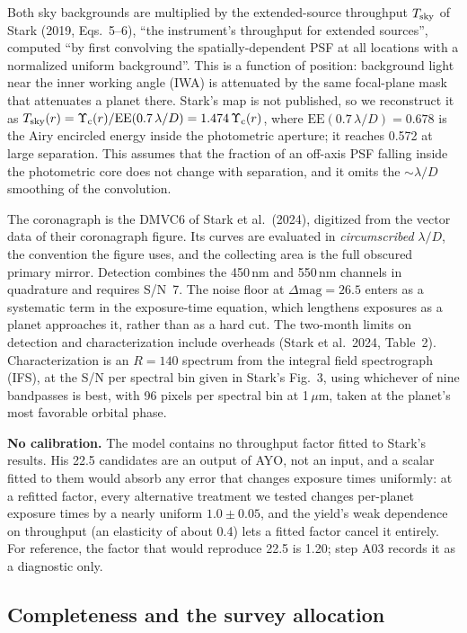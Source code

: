 \documentclass[11pt,a4paper]{article}
\begin{document}
Both sky backgrounds are multiplied by the extended-source throughput $T_{\rm sky}$ of Stark
(2019, Eqs.~5--6), ``the instrument's throughput for extended sources'', computed ``by first
convolving the spatially-dependent PSF at all locations with a normalized uniform background''.
This is a function of position: background light near the inner working angle (IWA) is attenuated
by the same focal-plane mask that attenuates a planet there. Stark's map is not published, so we
reconstruct it as $T_{\rm sky}(r) = \Upsilon_{\rm c}(r)/\mathrm{EE}(0.7\,\lambda/D)
= 1.474\,\Upsilon_{\rm c}(r)$, where $\mathrm{EE}(0.7\,\lambda/D) = 0.678$ is the Airy
encircled energy inside the photometric aperture; it reaches 0.572 at large separation. This
assumes that the fraction of an
off-axis PSF falling inside the photometric core does not change with separation, and it omits the
$\sim\lambda/D$ smoothing of the convolution.

The coronagraph is the DMVC6 of Stark et al.\ (2024), digitized from the vector data of their
coronagraph figure. Its curves are evaluated in \emph{circumscribed} $\lambda/D$, the convention
the figure uses, and the collecting area is the full obscured primary mirror. Detection combines
the 450\,nm and 550\,nm channels in quadrature and requires S/N~7. The noise floor at
$\Delta\mathrm{mag} = 26.5$ enters as a systematic term in the exposure-time equation, which
lengthens exposures as a planet approaches it, rather than as a hard cut. The two-month limits on
detection and characterization include overheads (Stark et al.\ 2024, Table~2). Characterization
is an $R = 140$ spectrum from the integral field spectrograph (IFS), at the S/N per spectral bin
given in Stark's Fig.~3, using whichever of nine bandpasses is best, with 96 pixels per spectral
bin at 1\,$\mu$m, taken at the planet's most favorable orbital phase.

\textbf{No calibration.} The model contains no throughput factor fitted to Stark's results. His
22.5 candidates are an output of AYO, not an input, and a scalar fitted to them would absorb any
error that changes exposure times uniformly: at a refitted factor, every alternative treatment we
tested changes per-planet exposure times by a nearly uniform $1.0 \pm 0.05$, and the yield's weak
dependence on throughput (an elasticity of about 0.4) lets a fitted factor cancel it entirely. For
reference, the factor that would reproduce 22.5 is 1.20; step A03 records it as a
diagnostic only.

\subsection{Completeness and the survey allocation}
\end{document}
